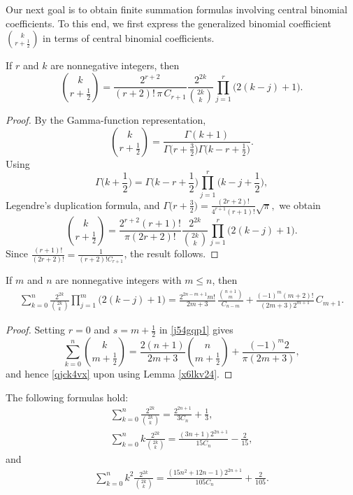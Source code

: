 \documentclass[12pt,reqno]{article}
\begin{document}
Our next goal is to obtain finite summation formulas involving central binomial coefficients. To this end, we first express the generalized binomial coefficient $\binom{k}{r+\frac12}$ in terms of central binomial coefficients.
\begin{lemma}\label{x6lkv24}
If $r$ and $k$ are nonnegative integers, then
\begin{equation*}
\binom{{k}}{r + \frac12} = \frac{2^{r + 2}}{(r + 2)!\,\pi\, C_{r + 1}}\frac{2^{2k}}{\binom{{2k}}{k}}\prod_{j = 1}^r \big(2(k - j) + 1\big).
\end{equation*}
\end{lemma}
\begin{proof}
	By the Gamma-function representation,
	$$
	\binom{k}{r+\frac12}
	=\frac{\Gamma(k+1)}
	{\Gamma\big(r+\frac32\big)
		\Gamma\big(k-r+\frac12\big)}.
	$$
	Using
\[
	\Gamma\Big(k+\frac12\Big)
=\Gamma\Big(k-r+\frac12\Big)
	\prod_{j=1}^r\Big(k-j+\frac12\Big),
\]
	Legendre's duplication formula, and
	$
	\Gamma\big(r+\frac32\big)
	=
	\frac{(2r+2)!}{4^{r+1}(r+1)!}\sqrt{\pi},
	$
	we obtain
	\[
	\binom{k}{r+\frac12}
	=
	\frac{2^{r+2}(r+1)!}{\pi(2r+2)!}
	\frac{2^{2k}}{\binom{2k}{k}}
	\prod_{j=1}^r\bigl(2(k-j)+1\bigr).
	\]
	Since
$\frac{(r+1)!}{(2r+2)!}
	=	\frac{1}{(r+2)!C_{r+1}}$,
	the result follows.
\end{proof}
\begin{proposition}
If $m$ and $n$ are nonnegative integers with $m\leq n$, then
\begin{align}\label{qjck4vx}
\sum_{k = 0}^n \frac{2^{2k}}{\binom{2k}{k}} \prod_{j = 1}^m \big(2(k - j) + 1 \big) 
= \frac{2^{2n-m+1}m!}{2m+3}\,\frac{\binom{n + 1}{m}}{C_{n - m}} +  \frac{(- 1)^m (m + 2)!}{(2m + 3)2^{m + 1}}\,C_{m + 1}.
\end{align}
\end{proposition}
\begin{proof}
Setting $r=0$ and $s=m+\frac12$ in \eqref{j54gqp1} gives
\begin{equation*}
\sum_{k = 0}^n \binom{{k}}{{m + \frac12}} = \frac{2(n + 1)}{2m + 3}\binom{{n}}{{m + \frac12}} + \frac{( - 1)^m 2}{\pi (2m + 3)},
\end{equation*}
and hence \eqref{qjck4vx} upon using Lemma \ref{x6lkv24}.
\end{proof}
\begin{corollary}\label{cb_cor}
The following formulas hold:
\begin{gather}
\sum_{k = 0}^n \frac{2^{2k}}{\binom{{2k}}{k}} = \frac{{2^{2n + 1}}}{{3C_n }} + \frac{1}{3},\label{Cor5-1}\\
\sum_{k = 0}^n k\frac{ 2^{2k}}{\binom{{2k}}{k}} = \frac{{(3n+1)2^{2n + 1}}}{{15C_n }} - \frac{2}{15},\label{Cor5-2}
\end{gather}
and
\begin{gather}
\sum_{k = 0}^n k^2\frac{ 2^{2k}}{\binom{{2k}}{k}} = \frac{(15n^2+12n-1)2^{2n + 1}}{105C_n}+ \frac{2}{105}.\label{Cor5-3}
\end{gather}
\end{corollary}
\end{document}
